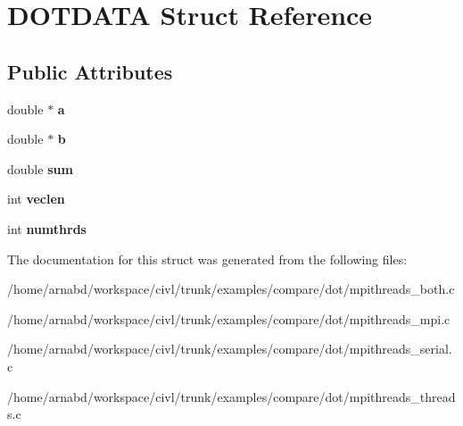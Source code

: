 \hypertarget{structDOTDATA}{}\section{D\+O\+T\+D\+A\+T\+A Struct Reference}
\label{structDOTDATA}
\subsection*{Public Attributes}
\begin{DoxyCompactItemize}
\item 
\hypertarget{structDOTDATA_a228c135346069d9f09b280f21851ce27}{}double $\ast$ {\bfseries a}\label{structDOTDATA_a228c135346069d9f09b280f21851ce27}

\item 
\hypertarget{structDOTDATA_ae14dd43819ed59bfcb2088acd5b27001}{}double $\ast$ {\bfseries b}\label{structDOTDATA_ae14dd43819ed59bfcb2088acd5b27001}

\item 
\hypertarget{structDOTDATA_a4cdeceeeb7b148c4624e7da94c77fe16}{}double {\bfseries sum}\label{structDOTDATA_a4cdeceeeb7b148c4624e7da94c77fe16}

\item 
\hypertarget{structDOTDATA_a2ffd54d3cb159126ce07b044c4abd36c}{}int {\bfseries veclen}\label{structDOTDATA_a2ffd54d3cb159126ce07b044c4abd36c}

\item 
\hypertarget{structDOTDATA_a55bf07760ea43fde97410dc8289246bf}{}int {\bfseries numthrds}\label{structDOTDATA_a55bf07760ea43fde97410dc8289246bf}

\end{DoxyCompactItemize}


The documentation for this struct was generated from the following files\+:\begin{DoxyCompactItemize}
\item 
/home/arnabd/workspace/civl/trunk/examples/compare/dot/mpithreads\+\_\+both.\+c\item 
/home/arnabd/workspace/civl/trunk/examples/compare/dot/mpithreads\+\_\+mpi.\+c\item 
/home/arnabd/workspace/civl/trunk/examples/compare/dot/mpithreads\+\_\+serial.\+c\item 
/home/arnabd/workspace/civl/trunk/examples/compare/dot/mpithreads\+\_\+threads.\+c\end{DoxyCompactItemize}
